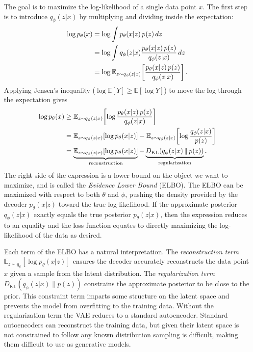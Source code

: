 The goal is to maximize the log-likelihood of a single data point $x$.
The first step is to introduce $q_\phi(z|x)$ by multiplying and dividing inside the expectation:
\begin{align}
    \log p_\theta(x)
    &= \log \int p_\theta(x|z)\,p(z)\,dz \notag \\
    &= \log \int q_\phi(z|x) \frac{p_\theta(x|z)\,p(z)}{q_\phi(z|x)}\,dz \notag \\
    &= \log \mathbb{E}_{z \sim q_\phi(z|x)}\!\left[\frac{p_\theta(x|z)\,p(z)}{q_\phi(z|x)}\right].
    \label{eqn:elbo_step1}
\end{align}
Applying Jensen's inequality ($\log \mathbb{E}[Y] \geq \mathbb{E}[\log Y]$) to move the log through the expectation gives
\begin{align}
    \log p_\theta(x)
    &\geq \mathbb{E}_{z \sim q_\phi(z|x)}\!\left[\log \frac{p_\theta(x|z)\,p(z)}{q_\phi(z|x)}\right] \notag \\
    &= \mathbb{E}_{z \sim q_\phi(z|x)}\!\left[\log p_\theta(x|z)\right]
       - \mathbb{E}_{z \sim q_\phi(z|x)}\!\left[\log \frac{q_\phi(z|x)}{p(z)}\right] \notag \\
    &= \underbrace{\mathbb{E}_{z \sim q_\phi(z|x)}\!\left[\log p_\theta(x|z)\right]}_{\text{reconstruction}}
       - \underbrace{D_\text{KL}\!\left(q_\phi(z|x) \,\|\, p(z)\right)}_{\text{regularization}}.
    \label{eqn:elbo}
\end{align}
The right side of the expression is a lower bound on the object we want to maximize, and is called the \textit{Evidence Lower Bound} (ELBO).
The ELBO can be maximized with respect to both $\theta$ and $\phi$, pushing the density provided by the decoder $p_{\theta}(x | z)$ toward the true log-likelihood.
If the approximate posterior $q_\phi(z|x)$ exactly equals the true posterior $p_\theta(z|x)$, then the expression reduces to an equality and the loss function equates to directly maximizing the log-likelihood of the data as desired.

Each term of the ELBO has a natural interpretation.
The \textit{reconstruction term} $\mathbb{E}_{z \sim q_\phi}[\log p_\theta(x|z)]$ ensures the decoder accurately reconstructs the data point $x$ given a sample from the latent distribution.
The \textit{regularization term} $D_\text{KL}(q_\phi(z|x) \| p(z))$ constrains the approximate posterior to be close to the prior.
This constraint term imparts some structure on the latent space and prevents the model from overfitting to the training data.
Without the regularization term the VAE reduces to a standard autoencoder.
Standard autoencoders can reconstruct the training data, but given their latent space is not constrained to follow any known distribution sampling is difficult, making them difficult to use as generative models.

